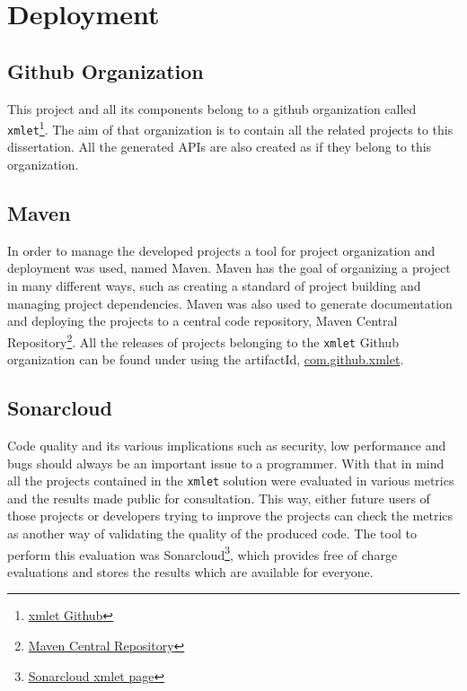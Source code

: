 \chapter{Deployment}
\label{cha:deployment}

\section{Github Organization} %
\label{sec:github}

This project and all its components belong to a github organization called \texttt{xmlet}\footnote{\href{https://github.com/xmlet}{xmlet Github}}. The aim of that organization is to contain all the related projects to this dissertation. All the generated \ac{API}s are also created as if they belong to this organization. 

\section{Maven} %
\label{sec:maven}

In order to manage the developed projects a tool for project organization and deployment was used, named Maven. Maven has the goal of organizing a project in many different ways, such as creating a standard of project building and managing project dependencies. Maven was also used to generate documentation and deploying the projects to a central code repository, Maven Central Repository\footnote{\href{https://search.maven.org/}{Maven Central Repository}}. All the releases of projects belonging to the \texttt{xmlet} Github organization can be found under using the artifactId, \href{https://search.maven.org/#search%7Cga%7C1%7Ccom.github.xmlet}{com.github.xmlet}. 

\section{Sonarcloud} %
\label{sec:sonarcloud}

Code quality and its various implications such as security, low performance and bugs should always be an important issue to a programmer. With that in mind all the projects contained in the \texttt{xmlet} solution were evaluated in various metrics and the results made public for consultation. This way, either future users of those projects or developers trying to improve the projects can check the metrics as another way of validating the quality of the produced code. The tool to perform this evaluation was Sonarcloud\footnote{\href{https://sonarcloud.io/organizations/xmlet/projects}{Sonarcloud xmlet page}}, which provides free of charge evaluations and stores the results which are available for everyone.

